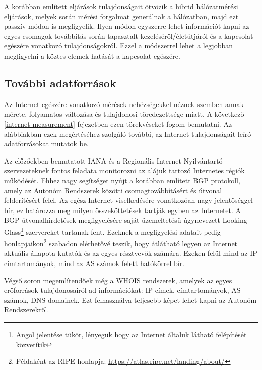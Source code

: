 A korábban említett eljárások tulajdonságait ötvözik a hibrid hálózatmérési eljárások, melyek során mérési forgalmat generálnak a hálózatban, majd ezt passzív módon is megfigyelik. Ilyen módon egyszerre lehet információt kapni az egyes csomagok továbbítás során tapasztalt kezeléséről/életútjáról és a kapcsolat egészére vonatkozó tulajdonságokról. Ezzel a módszerrel lehet a legjobban megfigyelni a köztes elemek hatását a kapcsolat egészére.

\subsection{További adatforrások}

Az Internet egészére vonatkozó mérések nehézségekkel néznek szemben annak mérete, folyamatos változása és tulajdonosi töredezettsége miatt. A következő \ref{internet-measurement} fejezetben ezen törekvéseket fogom bemutatni. Az alábbiakban ezek megértéséhez szolgáló további, az Internet tulajdonságait leíró adatforrásokat mutatok be.

Az előzőekben bemutatott IANA és a Regionális Internet Nyilvántartó szervezeteknek fontos feladata monitorozni az alájuk tartozó Internetes régiók működését. Ehhez nagy segítséget nyújt a korábban említett BGP protokoll, amely az Autonóm Rendszerek közötti csomagtovábbításért és útvonal felderítésért felel. Az egész Internet viselkedésére vonatkozóan nagy jelentőséggel bír, ez határozza meg milyen összeköttetések tartják egyben az Internetet. A BGP útvonalhirdetések megfigyelésére saját üzemeltetésű úgynevezett Looking Glass\footnote{Angol jelentése tükör, lényegük hogy az Internet általuk látható felépítését közvetítik} szervereket tartanak fent. 
Ezeknek a megfigyelési adatait pedig honlapjaikon\footnote{Példaként az RIPE honlapja: \url{https://atlas.ripe.net/landing/about/}} szabadon elérhetővé teszik, hogy átlátható legyen az Internet aktuális állapota kutatók és az egyes résztvevők számára.
Ezeken felül mind az IP címtartományok, mind az AS számok felett hatókörrel bír.

Végső soron megemlítendőek még a WHOIS rendszerek, amelyek az egyes erőforrások tulajdonosairól ad információkat: IP címek, címtartományok, AS számok, DNS domainek. Ezt felhasználva teljesebb képet lehet kapni az Autonóm Rendszerekről. 







